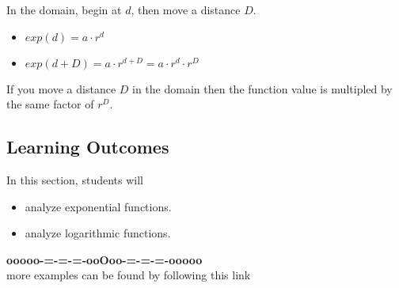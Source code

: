 \documentclass{ximera}
\begin{document}
\begin{procedure}

In the domain, begin at $d$, then move a distance $D$. \\

\begin{itemize}
\item $exp(d) = a \cdot r^d$
\item $exp(d+D) = a \cdot r^{d+D} = a \cdot r^d \cdot r^D$
\end{itemize}


If you move a distance $D$ in the domain then the function value is multipled by the same factor of $r^D$.






\end{procedure}


\subsection*{Learning Outcomes}



\begin{sectionOutcomes}
In this section, students will 

\begin{itemize}
\item analyze exponential functions.
\item analyze logarithmic functions.
\end{itemize}
\end{sectionOutcomes}















\begin{center}
\textbf{\textcolor{green!50!black}{ooooo-=-=-=-ooOoo-=-=-=-ooooo}} \\

more examples can be found by following this link\\ 

\end{center}
\end{document}
